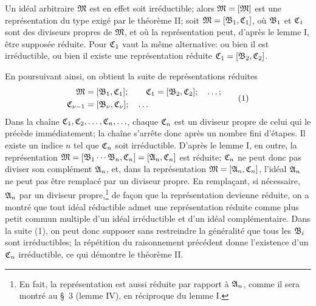 Un idéal arbitraire $\mathfrak{M}$ est en effet soit irréductible; alors $\mathfrak{M}=[\mathfrak{M}]$ est une représentation du type exigé par le théorème II; soit $\mathfrak{M}=[\mathfrak{B}_1,\mathfrak{C}_1]$, où $\mathfrak{B}_1$ et $\mathfrak{C}_1$ sont des diviseurs propres de $\mathfrak{M}$, et où la représentation peut, d'après le lemme I, être supposée réduite. Pour $\mathfrak{C}_1$ vaut la même alternative: ou bien il est irréductible, ou bien il existe une représentation réduite $\mathfrak{C}_1=[\mathfrak{B}_2,\mathfrak{C}_2]$.

En poursuivant ainsi, on obtient la suite de représentations réduites
\begin{equation}
\begin{aligned}
 \mathfrak{M}&=[\mathfrak{B}_1,\mathfrak{C}_1];\qquad
 \mathfrak{C}_1=[\mathfrak{B}_2,\mathfrak{C}_2];\quad\ldots;\\
 \mathfrak{C}_{\nu-1}&=[\mathfrak{B}_\nu,\mathfrak{C}_\nu];\quad\ldots
\end{aligned}
\tag{1}
\end{equation}
Dans la chaîne $\mathfrak{C}_1,\mathfrak{C}_2,\ldots,\mathfrak{C}_n,\ldots$, chaque $\mathfrak{C}_n$ est un diviseur propre de celui qui le précède immédiatement; la chaîne s'arrête donc après un nombre fini d'étapes. Il existe un indice $n$ tel que $\mathfrak{C}_n$ soit irréductible. D'après le lemme I, en outre, la représentation $\mathfrak{M}=[\mathfrak{B}_1\cdots\mathfrak{B}_n,\mathfrak{C}_n]=[\mathfrak{A}_n,\mathfrak{C}_n]$ est réduite; $\mathfrak{C}_n$ ne peut donc pas diviser son complément $\mathfrak{A}_n$, et, dans la représentation $\mathfrak{M}=[\mathfrak{A}_n,\mathfrak{C}_n]$, l'idéal $\mathfrak{A}_n$ ne peut pas être remplacé par un diviseur propre. En remplaçant, si nécessaire, $\mathfrak{A}_n$ par un diviseur propre,\footnote{En fait, la représentation est aussi réduite par rapport à $\mathfrak{A}_n$, comme il sera montré au \S~3 (lemme IV), en réciproque du lemme I.} de façon que la représentation devienne réduite, on a montré que tout idéal réductible admet une représentation réduite comme plus petit commun multiple d'un idéal irréductible et d'un idéal complémentaire. Dans la suite (1), on peut donc supposer sans restreindre la généralité que tous les $\mathfrak{B}_i$ sont irréductibles; la répétition du raisonnement précédent donne l'existence d'un $\mathfrak{C}_n$ irréductible, ce qui démontre le théorème II.
